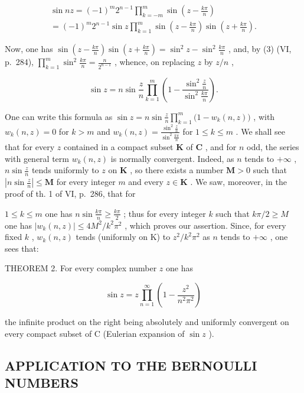 \[
\begin{array}{l} \sin n z = (- 1) ^ {m}   2 ^ {n - 1}   \prod_ {k = - m} ^ {m}   \sin \left(z - \frac {k \pi}{n}\right) \\ = (- 1) ^ {m}   2 ^ {n - 1}   \sin z   \prod_ {k = 1} ^ {m}   \sin \left(z - \frac {k \pi}{n}\right) \sin \left(z + \frac {k \pi}{n}\right). \end{array}
\]

Now, one has \(\sin\left(z-\frac{k\pi}{n}\right)\sin\left(z+\frac{k\pi}{n}\right)=\sin^{2}z-\sin^{2}\frac{k\pi}{n}\) , and, by (3) (VI, p.~284), \(\prod_{k=1}^{m}\sin^{2}\frac{k\pi}{n}=\frac{n}{2^{n-1}}\) , whence, on replacing \(z\) by \(z/n\) ,

\[
\sin z = n \sin \frac {z}{n} \prod_ {k = 1} ^ {m} \left(1 - \frac {\sin^ {2} \frac {z}{n}}{\sin^ {2} \frac {k \pi}{n}}\right).\tag{9}
\]

One can write this formula as \(\sin z = n\sin \frac{z}{n}\prod_{k = 1}^{m}\big(1 - w_k(n,z)\big)\) , with \(w_{k}(n,z) = 0\) for \(k > m\) and \(w_{k}(n,z) = \frac{\sin^{2}\frac{z}{n}}{\sin^{2}\frac{k\pi}{n}}\) for \(1\leqslant k\leqslant m\) . We shall see that for every \(z\) contained in a compact subset \(\mathbf{K}\) of \(\mathbf{C}\) , and for \(n\) odd, the series with general term \(w_{k}(n,z)\) is normally convergent. Indeed, as \(n\) tends to \(+\infty\) , \(n\sin \frac{z}{n}\) tends uniformly to \(z\) on \(\mathbf{K}\) , so there exists a number \(\mathbf{M} > 0\) such that \(\left|n\sin \frac{z}{n}\right|\leqslant \mathbf{M}\) for every integer \(m\) and every \(z\in \mathbf{K}\) . We saw, moreover, in the proof of th. 1 of VI, p.~286, that for

\(1 \leqslant k \leqslant m\) one has \(n \sin \frac{k\pi}{n} \geqslant \frac{k\pi}{2}\) ; thus for every integer \(k\) such that \(k\pi/2 \geqslant M\) one has \(|w_k(n, z)| \leqslant 4M^2/k^2\pi^2\) , which proves our assertion. Since, for every fixed \(k\) , \(w_k(n, z)\) tends (uniformly on K) to \(z^2/k^2\pi^2\) as \(n\) tends to \(+\infty\) , one sees that:

THEOREM 2. For every complex number \(z\) one has

\[
\sin z = z \prod_ {n = 1} ^ {\infty} \left(1 - \frac {z ^ {2}}{n ^ {2} \pi^ {2}}\right)\tag{10}
\]

the infinite product on the right being absolutely and uniformly convergent on every compact subset of C (Eulerian expansion of \(\sin z\) ).

\subsection{APPLICATION TO THE BERNOULLI NUMBERS}

